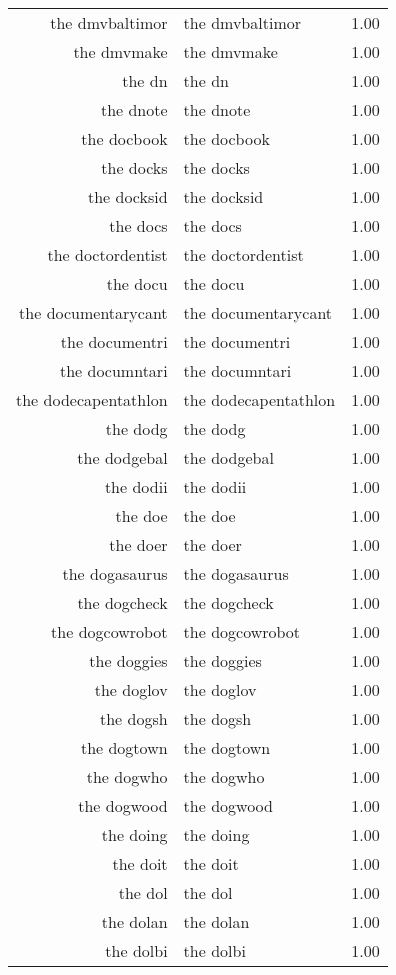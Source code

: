 \begin{table}[ht]
\begin{tabular}{rlr}
  the dmvbaltimor & the dmvbaltimor & 1.00 \\ 
  the dmvmake & the dmvmake & 1.00 \\ 
  the dn & the dn & 1.00 \\ 
  the dnote & the dnote & 1.00 \\ 
  the docbook & the docbook & 1.00 \\ 
  the docks & the docks & 1.00 \\ 
  the docksid & the docksid & 1.00 \\ 
  the docs & the docs & 1.00 \\ 
  the doctordentist & the doctordentist & 1.00 \\ 
  the docu & the docu & 1.00 \\ 
  the documentarycant & the documentarycant & 1.00 \\ 
  the documentri & the documentri & 1.00 \\ 
  the documntari & the documntari & 1.00 \\ 
  the dodecapentathlon & the dodecapentathlon & 1.00 \\ 
  the dodg & the dodg & 1.00 \\ 
  the dodgebal & the dodgebal & 1.00 \\ 
  the dodii & the dodii & 1.00 \\ 
  the doe & the doe & 1.00 \\ 
  the doer & the doer & 1.00 \\ 
  the dogasaurus & the dogasaurus & 1.00 \\ 
  the dogcheck & the dogcheck & 1.00 \\ 
  the dogcowrobot & the dogcowrobot & 1.00 \\ 
  the doggies & the doggies & 1.00 \\ 
  the doglov & the doglov & 1.00 \\ 
  the dogsh & the dogsh & 1.00 \\ 
  the dogtown & the dogtown & 1.00 \\ 
  the dogwho & the dogwho & 1.00 \\ 
  the dogwood & the dogwood & 1.00 \\ 
  the doing & the doing & 1.00 \\ 
  the doit & the doit & 1.00 \\ 
  the dol & the dol & 1.00 \\ 
  the dolan & the dolan & 1.00 \\ 
  the dolbi & the dolbi & 1.00 \\ 

\end{tabular}
\end{table}

